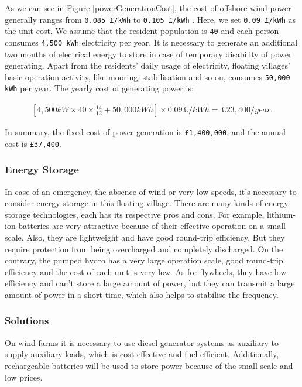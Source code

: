 \documentclass[11pt]{article}
\numberwithin{equation}{section}
\begin{document}
As we can see in Figure \ref{powerGenerationCost}, the cost of offshore wind power generally ranges from \texttt{0.085 £/kWh} to \texttt{0.105 £/kWh} \cite{10.1016/j.ijepes.2021.107273}. Here, we set \texttt{0.09 £/kWh} as the unit cost. We assume that the resident population is \texttt{40} and each person consumes \texttt{4,500 kWh} electricity per year. It is necessary to generate an additional two months of electrical energy to store in case of temporary disability of power generating. Apart from the residents’ daily usage of electricity, floating villages’ basic operation activity, like mooring, stabilisation and so on, consumes \texttt{50,000 kWh} per year.   The yearly cost of generating power is:

\begin{align}
\label{eqEnergyCost}
\left[4,500kW\times 40\times \frac{14}{12}+ 50,000kWh\right]\times 0.09 \pounds /kWh = \pounds23,400/year.
\end{align}

In summary, the fixed cost of power generation  is \texttt{£1,400,000}, and the annual cost is \texttt{£37,400}.

\subsubsection{Energy Storage}
\label{sec:org065e3b9}
In case of an emergency, the absence of wind or very low speeds, it’s necessary to consider energy storage in this floating village. There are many kinds of energy storage technologies, each has its respective pros and cons. For example, lithium-ion batteries are very attractive because of their effective operation on a small scale. Also, they are lightweight and have good round-trip efficiency. But they require protection from being overcharged and completely discharged. On the contrary, the pumped hydro has a very large operation scale, good round-trip efficiency and the cost of each unit is very low. As for flywheels, they have low efficiency and can’t store a large amount of power, but they can transmit a large amount of power in a short time, which also helps to stabilise the frequency.

\subsubsection{Solutions}
\label{sec:org3fd513a}
On wind farms it is necessary to use diesel generator systems as auxiliary to supply auxiliary loads, which is cost effective and fuel efficient. Additionally, rechargeable batteries will be used to store power because of the small scale and low prices.
\end{document}
